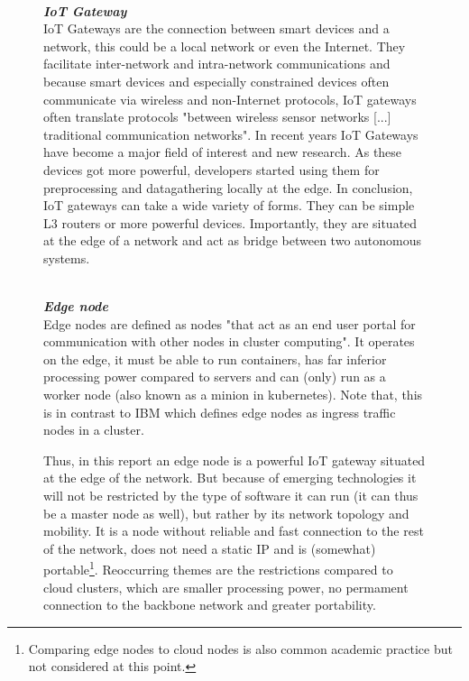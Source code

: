\begin{figure}[h!]
\vspace{0.5mm}\\
\textbf{\textit{IoT Gateway}}\\
IoT Gateways are the connection between smart devices and a network, this could be a local network or even the Internet. They facilitate inter-network and intra-network communications and because smart devices and especially constrained devices often communicate via wireless and non-Internet protocols, IoT gateways often translate protocols "between wireless sensor networks [...] traditional communication networks"\cite{zhu2010iotGatewayDefinition}.
In recent years IoT Gateways have become a major field of interest and new research. As these devices got more powerful, developers started using them for preprocessing and datagathering locally at the edge.
In conclusion, IoT gateways can take a wide variety of forms. They can be simple L3 routers or more powerful devices. Importantly, they are situated at the edge of a network and act as bridge between two autonomous systems.


\vspace{0.5mm}\\
\textbf\textit{Edge node}\\
Edge nodes are defined as nodes "that act as an end user portal for communication with other
nodes in cluster computing"\cite{Whatised17:edgeNodeDef}.
It operates on the edge, it must be able to run containers, has far inferior processing power compared to servers and can (only) run as a worker node (also known as a minion in kubernetes)\cite{NodesKub7:edgeNodeMinion}. Note that, this is in contrast to IBM which defines edge nodes as ingress traffic nodes in a cluster\cite{IBMCloudEdgeNodes0:online}.

Thus, in this report an edge node is a powerful IoT gateway situated at the edge of the network. But because of emerging technologies it will not be restricted by the type of software it can run (it can thus be a master node as well), but rather by its network topology and mobility. It is a node without reliable and fast connection to the rest of the network, does not need a static IP and is (somewhat) portable\footnote{Comparing edge nodes to cloud nodes is also common academic practice\cite{contstraintDevicesTerminology}  but not considered at this point.}.
Reoccurring themes are the restrictions compared to cloud clusters, which are smaller processing power,
no permament connection to the backbone network and greater portability.


\end{figure}
